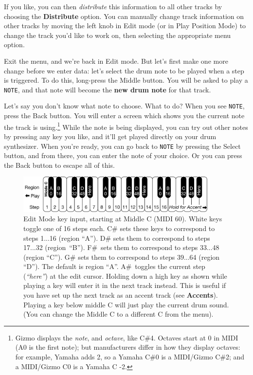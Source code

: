 \documentclass{article}
\begin{document}
If you like, you can then {\it distribute} this information to all other tracks by choosing the {\bf Distribute} option.  You can manually change track information on other tracks by moving the left knob in Edit mode (or in Play Position Mode) to change the track you'd like to work on, then selecting the appropriate menu option.

Exit the menu, and we're back in Edit mode.  But let's first make one more change before we enter data: let's select the drum note to be played when a step is triggered.  To do this, long-press the Middle button.  You will be asked to play a {\tt NOTE}, and that note will become the {\bf new drum note} for that track.  

\enlargethispage{0.5em}
Let's say you don't know what note to choose.  What to do?  When you see {\tt NOTE}, press the Back button.   You will enter a screen which shows you the current note the track is using.\footnote{Gizmo displays the {\it note}, and {\it octave}, like C\#4.  Octaves start at 0 in MIDI (A0 is the first note); but manufacturers differ in how they display octaves: for example, Yamaha adds 2, so a Yamaha C\#0 is a MIDI/Gizmo C\#2; and a MIDI/Gizmo C0 is a Yamaha C -2.}   While the note is being displayed, you can try out other notes by pressing any key you like, and it'll get played directly on your drum synthesizer.  When you're ready, you can go back to {\tt NOTE} by pressing the Select button, and from there, you can enter the note of your choice.  Or you can press the Back button to escape all of this.

\begin{figure}
\vspace{-0.5em}
\hspace{\fill}\includegraphics[width=4in]{EditModeKeys}
\vspace{-1em}
\caption{\small Edit Mode key input, starting at Middle C (MIDI 60).  White keys toggle one of 16 steps each.  C\# sets these keys to correspond to steps 1...16 (region ``A'').  D\# sets them to correspond to steps 17...32 (region~``B'').  F\#~sets them to correspond to steps 33...48 (region ``C'').  G\# sets them to correspond to steps 39...64 (region ``D'').  The default is region ``A''.  A\#~toggles the current step ({\it ``here''}) at the edit cursor.  Holding down a high key as shown while playing a key will enter it in the next track instead.  This is useful if you have set up the next track as an accent track (see {\bf Accents}).  Playing a key below middle C will just play the current drum sound. (You can change the Middle C to a different C from the menu).}
\vspace{-1em}
\label{editmodekeys}
\end{figure}
\end{document}
